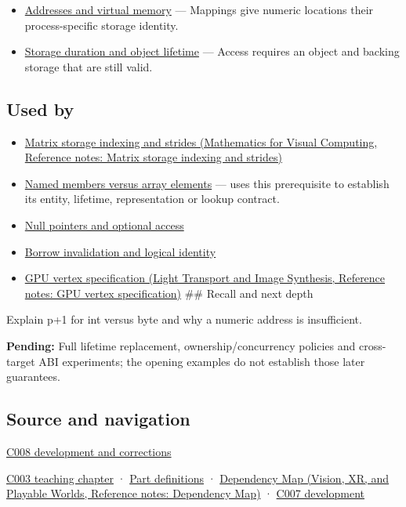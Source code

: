 \begin{itemize}
\tightlist
\item
  \hyperref[appendix-18ee4f913c3c]{Addresses and virtual memory} --- Mappings give numeric locations their process-specific storage identity.
\item
  \hyperref[appendix-0b104bcba06b]{Storage duration and object lifetime} --- Access requires an object and backing storage that are still valid.
\end{itemize}

\subsection{Used by}\label{appendix-6af5921bc853-used-by}

\hypertarget{appendix-6af5921bc853-used-by}{}

\begin{itemize}
\item
  \href{../02-Mathematics-for-Visual-Computing/main.pdf\#nameddest=appendix-ffdc1d4e5350}{Matrix storage indexing and strides (Mathematics for Visual Computing, Reference notes: Matrix storage indexing and strides)}
\item
  \hyperref[appendix-3f7e15effba6]{Named members versus array elements} --- uses this prerequisite to establish its entity, lifetime, representation or lookup contract.
\item
  \hyperref[appendix-afae48c31800]{Null pointers and optional access}
\item
  \hyperref[appendix-f9b8b9188c7f]{Borrow invalidation and logical identity}
\item
  \href{../04-Light-Transport-and-Image-Synthesis/main.pdf\#nameddest=appendix-749ba51a6c25}{GPU vertex specification (Light Transport and Image Synthesis, Reference notes: GPU vertex specification)} \#\# Recall and next depth
\end{itemize}

Explain p+1 for int versus byte and why a numeric address is insufficient.

\textbf{Pending:} Full lifetime replacement, ownership/concurrency policies and cross-target ABI experiments; the opening examples do not establish those later guarantees.

\subsection{Source and navigation}\label{appendix-6af5921bc853-source-and-navigation}

\hypertarget{appendix-6af5921bc853-source-and-navigation}{}

\hyperref[appendix-fd090d982a15-m008---parts-113-126]{C008 development and corrections}

\hyperref[01-foundations-i-ch002-where-the-bytes-live]{C003 teaching chapter} · \hyperref[appendix-fd090d982a15-m003---parts-41-60]{Part definitions} · \href{../07-Vision-XR-and-Playable-Worlds/main.pdf\#nameddest=appendix-4ad47bdd269a}{Dependency Map (Vision, XR, and Playable Worlds, Reference notes: Dependency Map)} · \hyperref[01-foundations-i-ch003-bringing-the-object-model-back-to-bytes]{C007 development}
